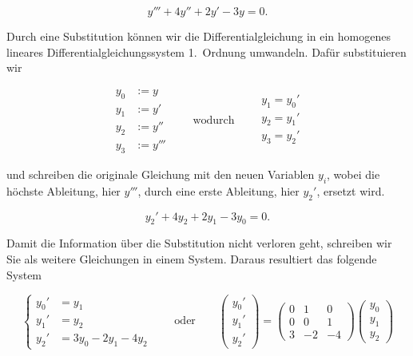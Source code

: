 \begin{equation*}
    y''' + 4 y'' + 2y' - 3 y = 0.
\end{equation*}

Durch eine Substitution können wir die Differentialgleichung in ein homogenes lineares Differentialgleichungssystem 1.\ Ordnung umwandeln. Dafür substituieren wir

\begin{equation*}
    \begin{aligned}
        y_0 &:= y \\
        y_1 &:= y' \\
        y_2 &:= y'' \\
        y_3 &:= y'''
    \end{aligned} \qquad \text{wodurch} \qquad
    \begin{aligned}
        y_1 = y_0' \\
        y_2 = y_1' \\
        y_3 = y_2' \\
    \end{aligned}
\end{equation*}

\vspace{0.25\baselineskip}

und schreiben die originale Gleichung mit den neuen Variablen \(y_i\), wobei die höchste Ableitung, hier \( y''' \), durch eine erste Ableitung, hier \( y_2' \), ersetzt wird. 

\begin{equation*}
    y_2' + 4y_2 + 2y_1 - 3y_0 = 0.
\end{equation*}

Damit die Information über die Substitution nicht verloren geht, schreiben wir Sie als weitere Gleichungen in einem System. Daraus resultiert das folgende System

\begin{equation*}
    \left\{ \begin{aligned}
        y_0' &= y_1 \\
        y_1' &= y_2 \\
        y_2' &= 3y_0 - 2y_1 -4y_2
    \end{aligned} \right. \qquad \text{oder} \qquad
    \begin{pmatrix}
        y_0' \\
        y_1' \\
        y_2'
    \end{pmatrix} =
    \begin{pmatrix}
        0 & 1 & 0 \\
        0 & 0 & 1 \\
        3 & -2 & -4
    \end{pmatrix}
    \begin{pmatrix}
        y_0 \\
        y_1 \\
        y_2
    \end{pmatrix} 
\end{equation*}

